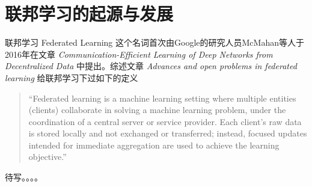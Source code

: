 \section{联邦学习的起源与发展}
\label{sec:fl_origin}

联邦学习 Federated Learning 这个名词首次由Google的研究人员McMahan等人于2016年在文章 \emph{Communication-Efficient Learning of Deep Networks from Decentralized Data}\cite{mcmahan2017fed_avg} 中提出。综述文章 \emph{Advances and open problems in federated learning}\cite{kairouz2019advances_fl} 给联邦学习下过如下的定义

\begin{quote}
    ``Federated learning is a machine learning setting where multiple entities (clients) collaborate in solving a machine learning problem, under the coordination of a central server or service provider. Each client's raw data is stored locally and not exchanged or transferred; instead, focused updates intended for immediate aggregation are used to achieve the learning objective.''
\end{quote}

待写。。。。
